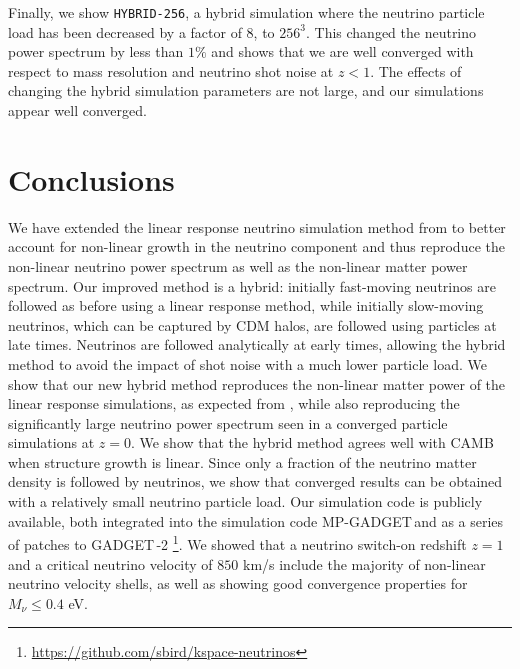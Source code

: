 \documentclass[useAMS, usenatbib]{mnras}
\newcommand{\gadget}{{\small GADGET\,}}
\begin{document}
Finally, we show \texttt{HYBRID-256}, a hybrid simulation where the neutrino particle load has been decreased by a factor of $8$, to $256^3$. This changed the neutrino power spectrum by less than $1\%$ and shows that we are well converged with respect to mass resolution and neutrino shot noise at $z < 1$.
The effects of changing the hybrid simulation parameters are not large, and our simulations appear well converged.

\section{Conclusions}
\label{sec:conclusion}

We have extended the linear response neutrino simulation method from \cite{AHB} to better account for non-linear growth in the neutrino component and thus reproduce the non-linear neutrino power spectrum as well as the non-linear matter power spectrum.
Our improved method is a hybrid: initially fast-moving neutrinos are followed as before using a linear response method, while initially slow-moving neutrinos, which can be captured by CDM halos, are followed using particles at late times. Neutrinos are followed analytically at early times, allowing the hybrid method to avoid the impact of shot noise with a much lower particle load. We show that our new hybrid method reproduces the non-linear matter power of the linear response simulations, as expected from \cite{AHB}, while also reproducing the significantly large neutrino power spectrum seen in a converged particle simulations at $z=0$. We show that the hybrid method agrees well with CAMB when structure growth is linear. Since only a fraction of the neutrino matter density is followed by neutrinos, we show that converged results can be obtained with a relatively small neutrino particle load. Our simulation code is publicly available, both integrated into the simulation code MP-\gadget and as a series of patches to \gadget-2 \footnote{\url{https://github.com/sbird/kspace-neutrinos}}. We showed that a neutrino switch-on redshift $z=1$ and a critical neutrino velocity of $850$ km/s include the majority of non-linear neutrino velocity shells, as well as showing good convergence properties for $M_\nu \leq 0.4$ eV.

\end{document}
